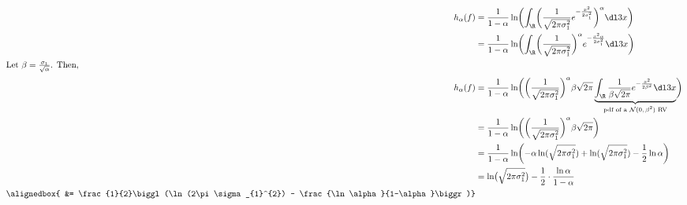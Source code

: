 \documentclass[
  coursecode={MTHE 474},
  assignmentname={Homework \homeworknumber},
  studentnumber=20053722,
  name={Bryan Hoang},
  draft,
]{
  ltxanswer%
}
\begin{document}
  \begin{questions}
    \setcounter{question}{\questionnumber}
    \addtocounter{question}{-1}
    \question[15]\
    \begin{parts}
      \part{}
      \begin{solution}
        \begin{align*}
          h_{\alpha}(f) &= \frac{1}{1-\alpha} \ln \biggl(\int_{\R} \biggl(\frac{1}{\sqrt{2\pi\sigma_{1}^{2}}} e^{-\frac{x^{2}}{2\sigma_{1}^{2}}} \biggr)^{\alpha} \dl3x\biggr)                                                                                                       \\
                        &= \frac{1}{1-\alpha} \ln \biggl(\int_{\R} \biggl(\frac{1}{\sqrt{2\pi\sigma_{1}^{2}}}\biggr)^{\alpha} e^{-\frac{x^{2}\alpha}{2\sigma_{1}^{2}}} \dl3x\biggr)                                                                                                  \\
          \intertext{Let \(\beta=\frac{\sigma_{1}}{\sqrt{\alpha}}\). Then,}
          h_{\alpha}(f) &= \frac{1}{1-\alpha} \ln \biggl(\biggl(\frac{1}{\sqrt{2\pi\sigma_{1}^{2}}}\biggr)^{\alpha} \beta\sqrt{2\pi} \underbrace{\int_{\R} \frac{1}{\beta\sqrt{2\pi}} e^{-\frac{x^{2}}{2\beta^{2}}} \dl3x}_{\text{pdf of a \(\mathcal{N}(0, \beta^{2})\) RV}}\biggr) \\
                        &= \frac{1}{1-\alpha} \ln \biggl(\biggl(\frac{1}{\sqrt{2\pi\sigma_{1}^{2}}}\biggr)^{\alpha} \beta\sqrt{2\pi}\biggr)                                                                                                                                          \\
                        &= \frac{1}{1-\alpha} \ln \biggl(-\alpha\ln(\sqrt{2\pi\sigma_{1}^{2}}) + \ln(\sqrt{2\pi\sigma_{1}^{2}})-\frac{1}{2}\ln\alpha\biggr)                                                                                                                          \\
                        &= \ln\bigl(\sqrt{2\pi\sigma_{1}^{2}}\bigr) - \frac{1}{2} \cdot \frac{\ln\alpha}{1-\alpha}                                                                                                                                                                   \\
          \alignedbox{  &= \frac{1}{2}\biggl(\ln(2\pi\sigma_{1}^{2}) - \frac{\ln\alpha}{1-\alpha}\biggr)}

\end{align*}
\end{solution}
\end{parts}
\end{questions}
\end{document}
